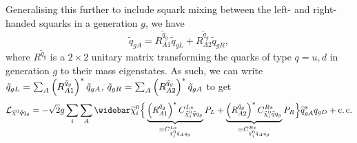 \documentclass[../main.tex]{subfiles}
\begin{document}
Generalising this further to include squark mixing between the left- and
right-handed squarks in a generation \(g\), we have
\begin{equation}
  \tilde{q}_{gA} = R_{A1}^{\tilde{q}_g} \tilde{q}_{gL} + R_{A2}^{\tilde{q}_g} \tilde{q}_{gR},
\end{equation}
where \(R^{\tilde{q}_g}\) is a \(2\times 2\) unitary matrix transforming the quarks of type \(q = u, d\) in generation \(g\) to their mass eigenstates.
As such, we can write \(\tilde{q}_{gL} = \sum_A \left(R^{\tilde{q}_g}_{A1}\right)^\ast \tilde{q}_{gA}\), \(\tilde{q}_{gR} = \sum_A \left(R^{\tilde{q}_g}_{A2}\right)^\ast \tilde{q}_{gA}\) to get
\begin{equation}
  \label{susy:eq:nino_sqA_f_int}
  \L_{\tilde{\chi}^0 \tilde{q} q_g} = -\sqrt{2} g \sum_{i} \sum_A \barnino[i] \Big\{ \underbrace{\pclosed{R^{\tilde{q}_g}_{A1}}^\ast C_{\tilde{\chi}^0_i \tilde{q} q_g}^{L\ast}}_{\equiv C_{\tilde{\chi}^0_i \tilde{q}_A q_g}^{L\ast}} P_L + \underbrace{\pclosed{R^{\tilde{q}_g}_{A2}}^\ast C_{\tilde{\chi}^0_i \tilde{q} q_g}^{R\ast}}_{\equiv C_{\tilde{\chi}^0_i \tilde{q}_A q_g}^{R\ast}} P_R \Big\} \wtilde{q}_{gA}^\ast q_{gD} + \cc
\end{equation}
\end{document}
